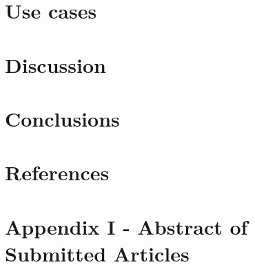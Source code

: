 \documentclass[a4paper,11pt]{article}
\begin{document}
\section{Use cases}



\section{Discussion}



\section{Conclusions}




\section{References}




\section{Appendix I - Abstract of Submitted Articles}

\end{document}

